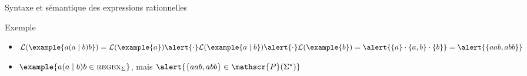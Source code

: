 \begin{frame}{Syntaxe et sémantique des expressions rationnelles}
  \vspace{-2mm}
  \begin{exampleblock}{Exemple}
  \begin{itemize}
    \item\vspace{-1mm} $\mathcal{L}(\example{a (a \mid b) b}) = \mathcal{L}(\example{a}) \alert{\cdot} \mathcal{L}(\example{a \mid b}) \alert{\cdot} \mathcal{L}(\example{b}) = \alert{\{a\} \cdot \{a, b\} \cdot \{b\}}  = \alert{\{aab, abb\}}$
    \item $\example{a (a \mid b) b \in \textsc{regex}_\Sigma}$, mais $\alert{\{aab, abb\} \in \mathscr{P}(\Sigma^\star)}$
    \end{itemize}
  \end{exampleblock}
 
\end{frame}

\endgroup
